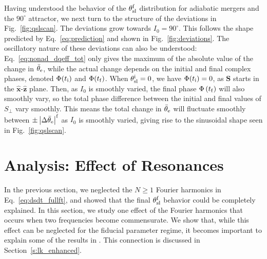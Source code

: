 \documentclass[
        twocolumn,
        twocolappendix
    ]{aastex63}
\newcommand*{\abs}[1]{\left|#1\right|}
\renewcommand*{\bm}[1]{\boldsymbol{\mathbf{#1}}}
\newcommand*{\uv}[1]{\hat{\bm{#1}}}
\newcommand*{\p}[1]{\left(#1\right)}
\begin{document}
Having understood the behavior of the $\theta_{\rm sl}^{\rm f}$ distribution for
adiabatic mergers and the $90^\circ$ attractor, we next turn to the structure of
the deviations in Fig.~\ref{fig:qslscan}. The deviations grow towards $I_0 =
90^\circ$. This follows the shape predicted by Eq.~\eqref{eq:prediction} and shown
in Fig.~\ref{fig:deviations}. The oscillatory nature of these deviations can
also be understood: Eq.~\eqref{eq:nonad_dqeff_tot} only gives the maximum of the
absolute value of the change in $\bar{\theta}_{\rm e}$, while the actual change
depends on the initial and final complex phases, denoted $\Phi(t_{\rm i})$ and
$\Phi(t_{\rm f})$. When $\theta_{\rm sl}^{\rm i} = 0$, we have $\Phi(t_{\rm i})
= 0$, as $\bm{S}$ starts in the $\uv{x}$-$\uv{z}$ plane. Then, as $I_0$ is
smoothly varied, the final phase $\Phi\p{t_{\rm f}}$ will also smoothly vary, so
the total phase difference between the initial and final values of $S_{\perp}$
vary smoothly. This means the total change in $\bar{\theta}_{\rm e}$ will
fluctuate smoothly between $\pm \abs{\Delta \bar{\theta}_{\rm e}}^{\rm f}$ as
$I_0$ is smoothly varied, giving rise to the sinusoidal shape seen in
Fig.~\ref{fig:qslscan}.

\section{Analysis: Effect of Resonances}\label{s:harmonic}

In the previous section, we neglected the $N \geq 1$ Fourier harmonics in
Eq.~\eqref{eq:dsdt_fullft}, and showed that the final $\theta_{\rm sl}^{\rm f}$
behavior could be completely explained. In this section, we study one effect of
the Fourier harmonics that occurs when two frequencies become commensurate.
We show that, while this effect can be neglected for the fiducial parameter
regime, it becomes important to explain some of the results in \citet{bin1}.
This connection is discussed in Section~\ref{s:lk_enhanced}.
\end{document}
